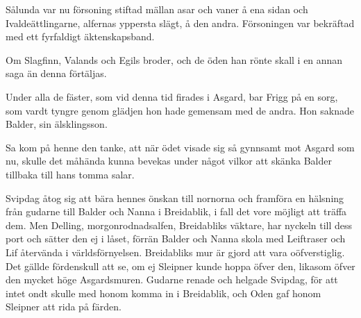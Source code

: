 Sålunda var nu försoning stiftad mällan asar och vaner å ena sidan och
Ivaldeättlingarne, alfernas yppersta slägt, å den andra. Försoningen var
bekräftad med ett fyrfaldigt äktenskapsband.

Om Slagfinn, Valands och Egils broder, och de öden han rönte skall i en
annan saga än denna förtäljas.

\sectionbreak

Under alla de fäster, som vid denna tid firades i Asgard, bar Frigg på
en sorg, som vardt tyngre genom glädjen hon hade gemensam med de andra.
Hon saknade Balder, sin älsklingsson.

Sa kom på henne den tanke, att när ödet visade sig så gynnsamt mot
Asgard som nu, skulle det måhända kunna bevekas under något vilkor att
skänka Balder tillbaka till hans tomma salar.

Svipdag åtog sig att bära hennes önskan till nornorna och framföra en
hälsning från gudarne till Balder och Nanna i Breidablik, i fall det
vore möjligt att träffa dem. Men Delling, morgonrodnadsalfen,
Breidabliks väktare, har nyckeln till dess port och sätter den ej i
låset, förrän Balder och Nanna skola med Leiftraser och Lif återvända i
världsförnyelsen. Breidabliks mur är gjord att vara oöfverstiglig. Det
gällde fördenskull att se, om ej Sleipner kunde hoppa öfver den, likasom
öfver den mycket höge Asgardsmuren. Gudarne renade och helgade Svipdag,
för att intet ondt skulle med honom komma in i Breidablik, och Oden gaf
honom Sleipner att rida på färden.

